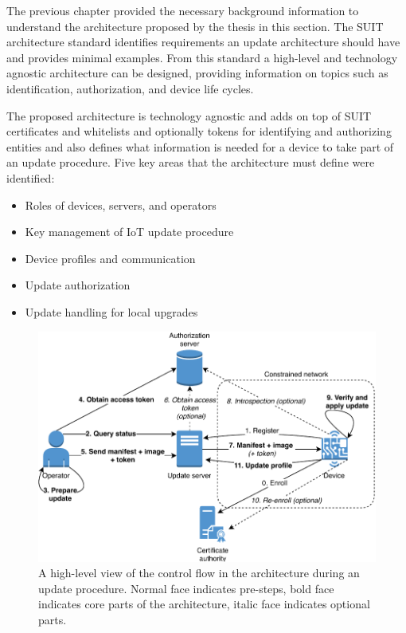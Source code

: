 \documentclass[0-thesis.tex]{subfiles}
\begin{document}
The previous chapter provided the necessary background information to understand the
architecture proposed by the thesis in this section. The SUIT architecture standard
identifies requirements an update architecture should have and provides minimal examples.
From this standard a high-level and technology agnostic architecture can be designed,
providing information on topics such as identification, authorization, and device life
cycles. 

The proposed architecture is technology agnostic and adds on top of SUIT certificates and
whitelists and optionally tokens for identifying and authorizing entities and also defines
what information is needed for a device to take part of an update procedure. Five key
areas that the architecture must define were identified:

\begin{itemize}
    \item Roles of devices, servers, and operators
    \item Key management of IoT update procedure
    \item Device profiles and communication
    \item Update authorization
    \item Update handling for local upgrades
\end{itemize}

\begin{figure}[t]
    \caption{A high-level view of the control flow in the architecture during an update procedure. Normal face indicates pre-steps, bold face indicates core parts of the architecture, italic face indicates optional parts.}
    \label{fig:communication-workflow}
    \includegraphics{images/update-flow.pdf}
\end{figure}
\end{document}
